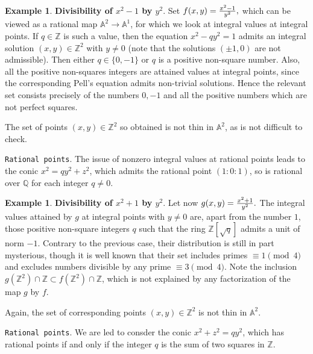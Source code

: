 \documentclass[leqno,12pt]{article} %
\def\A{{{\mathbb A}}}
\def\Z{{{\mathbb Z}}}
\def\Q{{{\mathbb Q}}}
\theoremstyle{plain} %
\theoremstyle{definition} %
\newtheorem{example}[theorem]{\indent\sc Example}
\begin{document}
\begin{example}\label{EX.-2} {\bf Divisibility of $x^2-1$ by $y^2$}.
Set   $
f(x,y)={x^2-1\over y^2},
$
 which can be viewed as a rational map $\A^2\to\A^1$, for which we look  at  integral values at integral points. If $q\in \Z$ is such a value, then the equation $x^2-qy^2=1$ admits an integral solution $(x,y)\in \Z^2$  with $y\neq 0$ (note that the solutions   $(\pm 1,0)$ are not admissible). Then either $q\in\{0,-1\}$ or $q$ is a positive non-square number. Also, all the positive non-squares integers are attained values at integral points, since the corresponding Pell's equation admits non-trivial solutions. Hence the relevant set consists precisely of the numbers $0,-1$ and all the positive numbers which are not perfect squares.   
 
 The set of points $(x,y)\in\Z^2$ so obtained is not thin in $\A^2$, as is not difficult to check.
 
 {\tt Rational points}. The issue of  nonzero integral values at rational points leads to the conic $x^2=qy^2+z^2$, which admits the rational point $(1:0:1)$, so is rational over $\Q$ for each integer $q\neq 0$.
\end{example}

\begin{example}\label{EX.-1} {\bf Divisibility of $x^2+1$ by $y^2$}.
Let  now 
$
g(x,y)={x^2+1\over y^2}.
$ 
The integral values attained by $g$ at integral points with $y\neq 0$ are, apart from the number $1$,  those positive non-square integers $q$ such that the ring $\Z[\sqrt{q}]$ admits a unit of norm $-1$. Contrary to the previous case, their distribution is still in part mysterious, though it is well known that  their set includes primes $\equiv 1\pmod 4$ and excludes numbers divisible by any  prime $\equiv 3\pmod 4$.   Note the inclusion $g(\Z^2)\cap \Z \subset f(\Z^2)\cap \Z$, which is not explained by any factorization of the map $g$ by $f$.

Again, the set of corresponding points $(x,y)\in\Z^2$   is not thin in $\A^2$.

 {\tt Rational points}. We are led to consder the conic $x^2+z^2=qy^2$, which has rational points if and only if the integer $q$ is the sum of two squares in $\Z$.  
\end{example}
\end{document}
